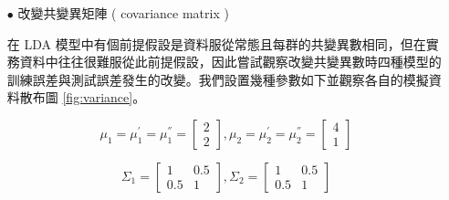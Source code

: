 \begin{itemize}
\renewcommand\arraystretch{1.5}
\begin{table}[h]
\scriptsize
\setlength{\belowcaptionskip}{0pt}
\centering
\caption{Error Rate of three Methods of changing mean vector for two classes}\label{tb:com2class-mean}
\end{table}

\newpage


\item[$\bullet$] 改變共變異矩陣 ( covariance matrix )

在 LDA 模型中有個前提假設是資料服從常態且每群的共變異數相同，但在實務資料中往往很難服從此前提假設，因此嘗試觀察改變共變異數時四種模型的訓練誤差與測試誤差發生的改變。我們設置幾種參數如下並觀察各自的模擬資料散布圖 \ref{fig:variance}。

$$ \mu_1 = \mu_1^{'}=\mu_1^{''} = \left[
            \begin{array}{clr}
                2  \\
                2 
            \end{array} \right] ,
            \mu_2 = \mu_2^{'} =\mu_2^{''} = \left[
            \begin{array}{clr}
                4  \\
                1 
            \end{array} \right] $$ 

$$ \Sigma_1 = \left[
            \begin{array}{clr}
                1 & 0.5  \\
                0.5 & 1
            \end{array} \right] ,
            \Sigma_2 = \left[
            \begin{array}{clr}
                1 & 0.5  \\
                0.5 & 1 
            \end{array} \right]  $$
            

\end{itemize}

